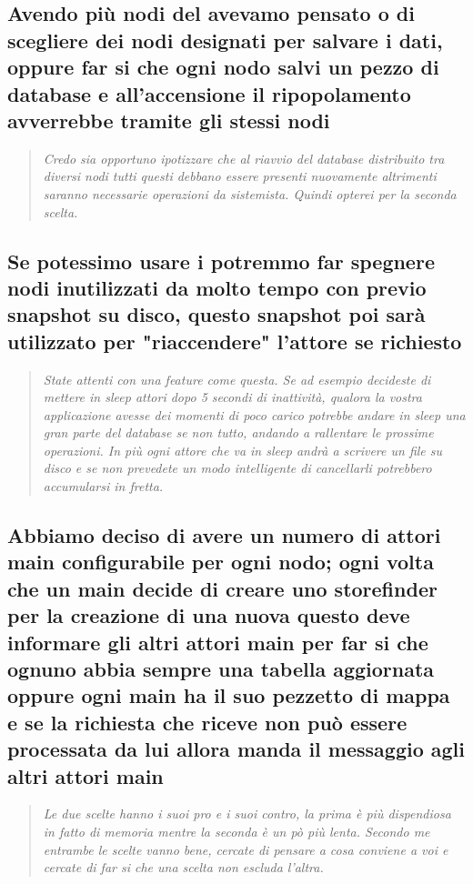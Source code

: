 \documentclass{scalatekids-article}
\begin{document}
\subsection{Avendo più nodi del  avevamo pensato o di scegliere dei nodi designati per salvare i dati, oppure far si che ogni nodo salvi un pezzo di database e all'accensione il ripopolamento avverrebbe tramite gli stessi nodi\\}
\begin{quote}
  \textit{Credo sia opportuno ipotizzare che al riavvio del database distribuito tra diversi nodi tutti questi debbano essere presenti nuovamente altrimenti saranno necessarie operazioni da sistemista. Quindi opterei per la seconda scelta.}
\end{quote}
\subsection{Se potessimo usare i  potremmo far spegnere nodi inutilizzati da molto tempo con previo snapshot su disco, questo snapshot poi sarà utilizzato per "riaccendere" l'attore se richiesto\\}
\begin{quote}
  \textit{State attenti con una feature come questa. Se ad esempio decideste di mettere in sleep attori dopo 5 secondi di inattività, qualora la vostra applicazione avesse dei momenti di poco carico potrebbe andare in sleep una gran parte del database se non tutto, andando a rallentare le prossime operazioni. In più ogni attore che va in sleep andrà a scrivere un file su disco e se non prevedete un modo intelligente di cancellarli potrebbero accumularsi in fretta.}
\end{quote}
\subsection{Abbiamo deciso di avere un numero di attori main configurabile per ogni nodo; ogni volta che un main decide di creare uno storefinder per la creazione di una nuova  questo deve informare gli altri attori main per far si che ognuno abbia sempre una tabella aggiornata oppure ogni main ha il suo pezzetto di mappa e se la richiesta che riceve non può essere processata da lui allora manda il messaggio agli altri attori main\\}
\begin{quote}
  \textit{Le due scelte hanno i suoi pro e i suoi contro, la prima è più dispendiosa in fatto di memoria mentre la seconda è un pò più lenta. Secondo me entrambe le scelte vanno bene, cercate di pensare a cosa conviene a voi e cercate di far si che una scelta non escluda l'altra.}
\end{quote}
\end{document}
